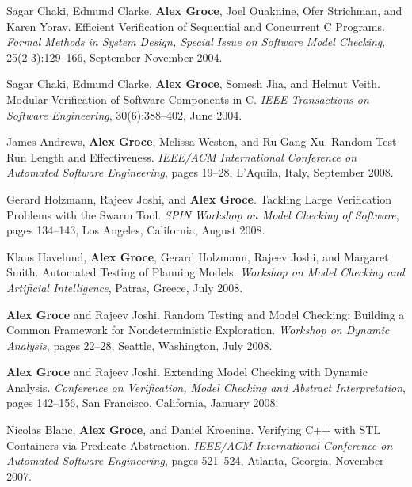 \documentclass[ComputerScience]{vita}
\begin{document}
\begin{vita}
\begin{Journal Publications}
\item
Sagar Chaki, Edmund Clarke, {\bf Alex Groce}, Joel Ouaknine, Ofer Strichman, and Karen Yorav.
\newblock Efficient Verification of Sequential and Concurrent C Programs.
\newblock \emph{Formal Methods in System Design, Special Issue on Software Model Checking}, 25(2-3):129--166, September-November 2004.

\item
Sagar Chaki, Edmund Clarke, {\bf Alex Groce}, Somesh Jha, and Helmut Veith.
\newblock Modular Verification of Software Components in C.
\newblock \emph{IEEE Transactions on Software Engineering}, 30(6):388--402, June 2004.

\end{Journal Publications}

\begin{Refereed Conference and Workshop Publications}

\item
James Andrews, {\bf Alex Groce}, Melissa Weston, and Ru-Gang Xu.
\newblock Random Test Run Length and Effectiveness.
\newblock \emph{IEEE/ACM International Conference on Automated Software Engineering}, pages 19--28, L'Aquila, Italy, September 2008.

\item
Gerard Holzmann, Rajeev Joshi, and {\bf Alex Groce}.
\newblock Tackling Large Verification Problems with the Swarm Tool.
\newblock \emph{SPIN Workshop on Model Checking of Software}, pages 134--143, Los Angeles, California, August 2008.

\item
Klaus Havelund, {\bf Alex Groce}, Gerard Holzmann, Rajeev Joshi, and Margaret Smith.
\newblock Automated Testing of Planning Models.
\newblock \emph{Workshop on Model Checking and Artificial Intelligence}, Patras, Greece, July 2008.

\item
{\bf Alex Groce} and Rajeev Joshi.
\newblock Random Testing and Model Checking:   Building a Common Framework for Nondeterministic Exploration.
\newblock \emph{Workshop on Dynamic Analysis}, pages 22--28, Seattle, Washington, July 2008.


\item
{\bf Alex Groce} and Rajeev Joshi.
\newblock Extending Model Checking with Dynamic Analysis.
\newblock \emph{Conference on Verification, Model Checking and Abstract Interpretation}, pages 142--156, San Francisco, California, January 2008.


\item
Nicolas Blanc, {\bf Alex Groce}, and Daniel Kroening.
\newblock Verifying C++ with STL Containers via Predicate Abstraction.
\newblock \emph{IEEE/ACM International Conference on Automated Software Engineering}, pages 521--524, Atlanta, Georgia, November 2007.



\end{Refereed Conference and Workshop Publications}
\end{vita}
\end{document}
